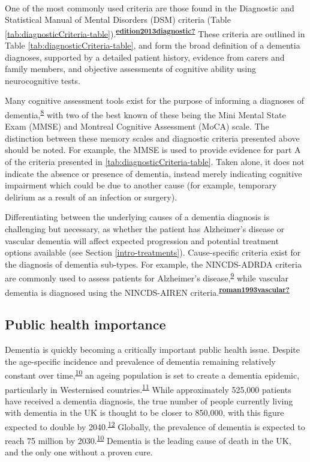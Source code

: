 \documentclass[a4paper, twoside]{templates/ociamthesis}
\begin{document}
~

One of the most commonly used criteria are those found in the Diagnostic and Statistical Manual of Mental Disorders (DSM) criteria (Table \ref{tab:diagnosticCriteria-table}).\textsuperscript{\protect\hyperlink{ref-edition2013diagnostic}{\textbf{edition2013diagnostic?}}} These criteria are outlined in Table \ref{tab:diagnosticCriteria-table}, and form the broad definition of a dementia diagnoses, supported by a detailed patient history, evidence from carers and family members, and objective assessments of cognitive ability using neurocognitive tests.

Many cognitive assessment tools exist for the purpose of informing a diagnoses of dementia,\textsuperscript{\protect\hyperlink{ref-sheehan2012}{8}} with two of the best known of these being the Mini Mental State Exam (MMSE) and Montreal Cognitive Assessment (MoCA) scale. The distinction between these memory scales and diagnostic criteria presented above should be noted. For example, the MMSE is used to provide evidence for part A of the criteria presented in \ref{tab:diagnosticCriteria-table}. Taken alone, it does not indicate the absence or presence of dementia, instead merely indicating cognitive impairment which could be due to another cause (for example, temporary delirium as a result of an infection or surgery).

Differentiating between the underlying causes of a dementia diagnosis is challenging but necessary, as whether the patient has Alzheimer's disease or vascular dementia will affect expected progression and potential treatment options available (see Section \ref{intro-treatments}). Cause-specific criteria exist for the diagnosis of dementia sub-types. For example, the NINCDS-ADRDA criteria are commonly used to assess patients for Alzheimer's disease,\textsuperscript{\protect\hyperlink{ref-dubois2007}{9}} while vascular dementia is diagnosed using the NINCDS-AIREN criteria.\textsuperscript{\protect\hyperlink{ref-roman1993vascular}{\textbf{roman1993vascular?}}}

\hypertarget{public-health-importance}{%
\subsection{Public health importance}\label{public-health-importance}}

Dementia is quickly becoming a critically important public health issue. Despite the age-specific incidence and prevalence of dementia remaining relatively constant over time,\textsuperscript{\protect\hyperlink{ref-prince2016}{10}} an ageing population is set to create a dementia epidemic, particularly in Westernised countries.\textsuperscript{\protect\hyperlink{ref-flier2005}{11}} While approximately 525,000 patients have received a dementia diagnosis, the true number of people currently living with dementia in the UK is thought to be closer to 850,000, with this figure expected to double by 2040.\textsuperscript{\protect\hyperlink{ref-baker2019}{12}} Globally, the prevalence of dementia is expected to reach 75 million by 2030.\textsuperscript{\protect\hyperlink{ref-prince2016}{10}} Dementia is the leading cause of death in the UK, and the only one without a proven cure.
\end{document}
